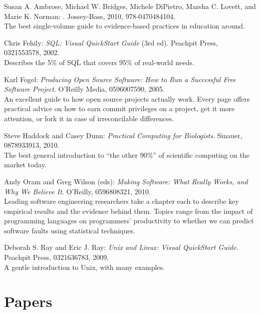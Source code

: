 \documentclass{book}
\begin{document}
\begin{swcitemize}
\item
  Susan A. Ambrose, Michael W. Bridges, Michele DiPietro, Marsha C.
  Lovett, and Marie K. Norman:
  \emph{}.
  Jossey-Bass, 2010, 978-0470484104. \\ The best single-volume guide to
  evidence-based practices in education around.
\item
  Chris Fehily: \emph{SQL: Visual QuickStart Guide} (3rd ed). Peachpit
  Press, 0321553578, 2002. \\ Describes the 5\% of SQL that covers 95\%
  of real-world needs.
\item
  Karl Fogel: \emph{Producing Open Source Software: How to Run a
  Successful Free Software Project}. O'Reilly Media, 0596007590, 2005.
  \\ An excellent guide to how open source projects actually work. Every
  page offers practical advice on how to earn commit privileges on a
  project, get it more attention, or fork it in case of irreconcilable
  differences.
\item
  Steve Haddock and Casey Dunn: \emph{Practical Computing for
  Biologists}. Sinauer, 0878933913, 2010. \\ The best general
  introduction to ``the other 90\%'' of scientific computing on the
  market today.
\item
  Andy Oram and Greg Wilson (eds): \emph{Making Software: What Really
  Works, and Why We Believe It}. O'Reilly, 0596808321, 2010. \\ Leading
  software engineering researchers take a chapter each to describe key
  empirical results and the evidence behind them. Topics range from the
  impact of programming languages on programmers' productivity to
  whether we can predict software faults using statistical techniques.
\item
  Deborah S. Ray and Eric J. Ray: \emph{Unix and Linux: Visual
  QuickStart Guide}. Peachpit Press, 0321636783, 2009. \\ A gentle
  introduction to Unix, with many examples.
\end{swcitemize}

\section{Papers}
\end{document}
